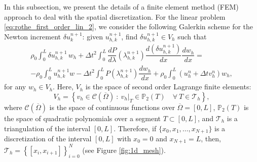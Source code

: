 \documentclass{sfuthesis}
\numberwithin{equation}{section}
\numberwithin{figure}{chapter}
\numberwithin{table}{chapter}
\theoremstyle{definition}
\newcommand{\der}[2]{\dfrac{d #1}{d #2}}
\begin{document}
In this subsection, we present the details of a finite element method (FEM) approach to deal with the spatial discretization. For the linear problem \eqref{eq:rothe_first_order_lin_2}, we consider the following Galerkin scheme for the Newton increment $\delta u_k^{n+1}$: given $u_{h,k}^{n+1}$, find $\delta u_{h,k}^{n+1} \in V_h$ such that 
\begin{multline} \label{eq:rothe_first_order_lin_3}
	\rho_0 \int_0^L \delta u_{h,k}^{n+1} \, w_h + \Delta t^2 \int_0^L \der{P}{\lambda}(\lambda_{h,k}^{n+1}) \der{(\delta u_{h,k}^{n+1})}{x} \der{w_h}{x} = \\
	-\rho_0 \int_0^L u_{h,k}^{n+1} w - \Delta t^2 \int_0^L P(\lambda_{h,k}^{n+1}) \der{w_h}{x} + \rho_0 \int_0^L (u_h^n+\Delta t v_h^n) w_h,
\end{multline}
for any $w_h \in V_h$. Here, $V_h$ is the space of second order Lagrange finite elements:
\begin{equation} \label{eq:fespace_1d}
    V_h = \left\{ v_h \in \mathcal{C}(\overline{\Omega}) \ : \ v_h \big|_T \in \mathbb{P}_2(T) \quad \forall \ T \in \mathcal{T}_h \right\},
\end{equation}
where $\mathcal{C}(\overline{\Omega})$ is the space of continuous functions over $\overline{\Omega} = [0,L]$, $\mathbb{P}_2(T)$ is the space of quadratic polynomials over a segment $T \subset [0,L]$, and $\mathcal{T}_h$ is a triangulation of the interval $[0,L]$. Therefore, if $\{x_0,x_1,\dots,x_{N+1}\}$ is a discretization of the interval $[0,L]$ with $x_0 = 0$ and $x_{N+1}=L$, then, $\mathcal{T}_h = \left\{ [x_i,x_{i+1}] \right\}_{i=0}^N$ (see Figure \ref{fig:1d_mesh}).
\end{document}
